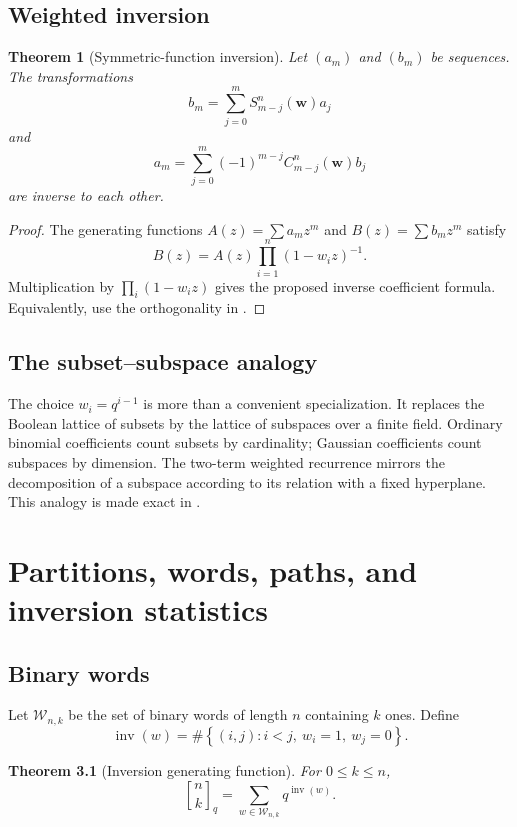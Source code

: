 \documentclass[11pt,oneside,openany]{book}
\newtheorem{theorem}{Theorem}[chapter]
\theoremstyle{definition}
\theoremstyle{remark}
\newcommand{\qbinom}[2]{\genfrac{[}{]}{0pt}{}{#1}{#2}_{q}}
\newcommand{\inv}{\operatorname{inv}}
\newcommand{\set}[1]{\left\{#1\right\}}
\begin{document}
\section{Weighted inversion}

\begin{theorem}[Symmetric-function inversion]\label{thm:weighted-inversion}
Let $(a_m)$ and $(b_m)$ be sequences.  The transformations
\[
 b_m=\sum_{j=0}^{m}S_{m-j}^n(\mathbf w)a_j
\]
and
\[
 a_m=\sum_{j=0}^{m}(-1)^{m-j}C_{m-j}^n(\mathbf w)b_j
\]
are inverse to each other.
\end{theorem}

\begin{proof}
The generating functions $A(z)=\sum a_mz^m$ and $B(z)=\sum b_mz^m$ satisfy
\[
 B(z)=A(z)\prod_{i=1}^{n}(1-w_i z)^{-1}.
\]
Multiplication by $\prod_i(1-w_i z)$ gives the proposed inverse coefficient formula.  Equivalently, use the orthogonality in .
\end{proof}

\section{The subset--subspace analogy}

The choice $w_i=q^{i-1}$ is more than a convenient specialization.  It replaces the Boolean lattice of subsets by the lattice of subspaces over a finite field.  Ordinary binomial coefficients count subsets by cardinality; Gaussian coefficients count subspaces by dimension.  The two-term weighted recurrence mirrors the decomposition of a subspace according to its relation with a fixed hyperplane.  This analogy is made exact in .

\chapter{Partitions, words, paths, and inversion statistics}\label{chap:combinatorics}

\section{Binary words}

Let $\mathcal W_{n,k}$ be the set of binary words of length $n$ containing $k$ ones.  Define
\[
 \inv(w)=\#\set{(i,j):i<j,\ w_i=1,\ w_j=0}.
\]

\begin{theorem}[Inversion generating function]\label{thm:binary-inversions}
For $0\le k\le n$,
\[
 \qbinom nk=\sum_{w\in\mathcal W_{n,k}}q^{\inv(w)}.
\]
\end{theorem}
\end{document}
